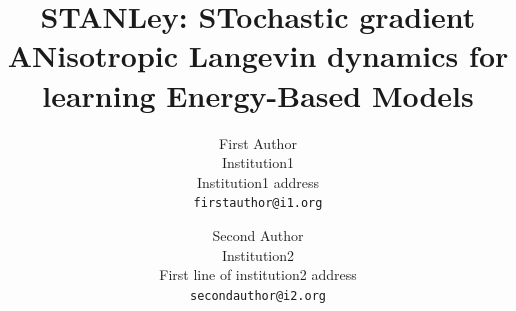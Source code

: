 \documentclass[10pt,twocolumn,letterpaper]{article}
\begin{document}
\title{STANLey: \textbf{ST}ochastic gradient \textbf{AN}isotropic \textbf{L}angevin dynamics for learning Energy-Based Models}

\author{First Author\\
Institution1\\
Institution1 address\\
{\tt\small firstauthor@i1.org}
\and
Second Author\\
Institution2\\
First line of institution2 address\\
{\tt\small secondauthor@i2.org}
}



\maketitle
\ificcvfinal\thispagestyle{empty}\fi
\end{document}
